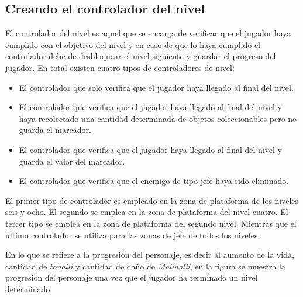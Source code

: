 \subsection{Creando el controlador del nivel}
El controlador del nivel es aquel que se encarga de verificar que el jugador
haya cumplido con el objetivo del nivel y en caso de que lo haya cumplido el
controlador debe de desbloquear el nivel siguiente y guardar el progreso del
jugador. En total existen cuatro tipos de controladores de nivel:
\begin{itemize}
    \item El controlador que solo verifica que el jugador haya llegado al final
    del nivel.
    \item El controlador que verifica que el jugador haya llegado al final del
    nivel y haya recolectado una cantidad determinada de objetos coleccionables
    pero no guarda el marcador.
    \item El controlador que verifica que el jugador haya llegado al final del
    nivel y guarda el valor del marcador.
    \item El controlador que verifica que el enemigo de tipo jefe haya sido
    eliminado.
\end{itemize}

El primer tipo de controlador es empleado en la zona de plataforma de los
niveles seis y ocho. El segundo se emplea en la zona de plataforma del nivel
cuatro. El tercer tipo se emplea en la zona de plataforma del segundo nivel.
Mientras que el último controlador se utiliza para las zonas de jefe de todos
los niveles.
\\
\par
En lo que se refiere a la progresión del personaje, es decir al aumento de la
vida, cantidad de \textit{tonalli} y cantidad de daño de \textit{Malinalli}, en
la figura se muestra la progresión del personaje una vez que el jugador ha
terminado un nivel determinado.


